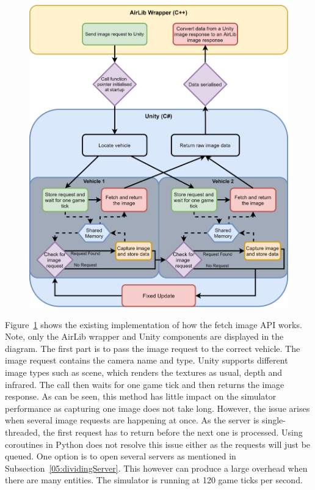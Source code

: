 \begin{figure}[p]
    \centering
    \includegraphics[width=1.0\textwidth]{06_Implementation/00_AirSim/Diagrams/imagecapture.png}
    \caption{} \label{06:imageCapture}
\end{figure}

Figure~\ref{06:imageCapture} shows the existing implementation of how the fetch image API works. Note, only the AirLib wrapper and Unity components are displayed in the diagram. The first part is to pass the image request to the correct vehicle. The image request contains the camera name and type. Unity supports different image types such as scene, which renders the textures as usual, depth and infrared. The call then waits for one game tick and then returns the image response. As can be seen, this method has little impact on the simulator performance as capturing one image does not take long. However, the issue arises when several image requests are happening at once. As the server is single-threaded, the first request has to return before the next one is processed. Using coroutines in Python does not resolve this issue either as the requests will just be queued. One option is to open several servers as mentioned in Subsection~\ref{05:dividingServer}. This however can produce a large overhead when there are many entities. The simulator is running at 120 game ticks per second.

